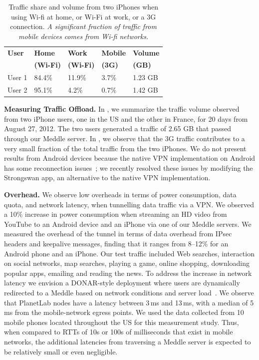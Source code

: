 \documentclass{sig-alternate-10pt}
\newcommand{\meddle}{{Meddle}\xspace}
\renewcommand{\fref}{\Fref}
\begin{document}
\begin{table}
\centering
\begin{small}
\begin{tabular}{|l|l|l|l|l|}
\hline
{\bf User} & {\bf Home} & {\bf Work} & {\bf Mobile} & {\bf Volume}\\
    & {\bf (Wi-Fi)} & {\bf (Wi-Fi)} & {\bf (3G)} & {\bf (GB)}\\
\hline
User 1 & 84.4\% & 11.9\% & 3.7\%  & 1.23 GB\\
\hline
User 2 & 95.1\% & 4.2\% & 0.7\%  & 1.42 GB\\
\hline
\end{tabular}
\end{small}
\caption{Traffic share and volume from two iPhones when using Wi-fi at
  home, or Wi-Fi at work, or a 3G connection. \emph{A significant
    fraction of traffic from mobile devices comes from Wi-fi networks.}}
\label{tab:Usage}
\vspace{-0.1in}
\end{table}

\textbf{Measuring Traffic Offload.} In \fref{tab:Usage}, we summarize
the traffic volume observed from two iPhone users, one in the US and
the other in France, for 20 days from August 27, 2012. The two users
generated a traffic of 2.65 GB that passed through our \meddle
server. In \fref{tab:Usage}, we observe that the 3G traffic contributes
to a very small fraction of the total traffic from the
two iPhones. We do not present results from Android devices because
the native VPN implementation on Android has some reconnection issues~\cite{OnDemandAndroid};
we recently resolved these issues by  modifying the Strongswan
app, an alternative to the native VPN implementation.

\textbf{Overhead.} We observe low overheads in terms of power
consumption, data quota, and network latency, when tunnelling data
traffic via a VPN. We observed a 10\%  increase in power consumption
when streaming an HD video from YouTube to an Android device and an
iPhone via one of our \meddle servers. We measured the overhead of the
tunnel in terms of data overhead from IPsec headers and keepalive
messages, finding that it ranges from 8--12\% for an Android phone and
an iPhone. Our test traffic included Web searches, interaction on
social networks, map searches, playing a game, online shopping,
downloading popular apps, emailing and reading the news. To address
the increase in network latency we envision a DONAR-style deployment
where users are dynamically redirected to a \meddle based on network
conditions and server load~\cite{wendell:donar}. We observe that
PlanetLab nodes have a latency between 3\,ms and 13\,ms, with a median
of 5\,ms from the mobile-network egress points. We used the data
collected from 10 mobile phones located throughout the US for this
measurement study. Thus, when compared to RTTs of 10s or 100s of
milliseconds that exist in mobile networks, the additional latencies
from traversing a \meddle server is expected to be relatively small or
even negligible.  
\end{document}
